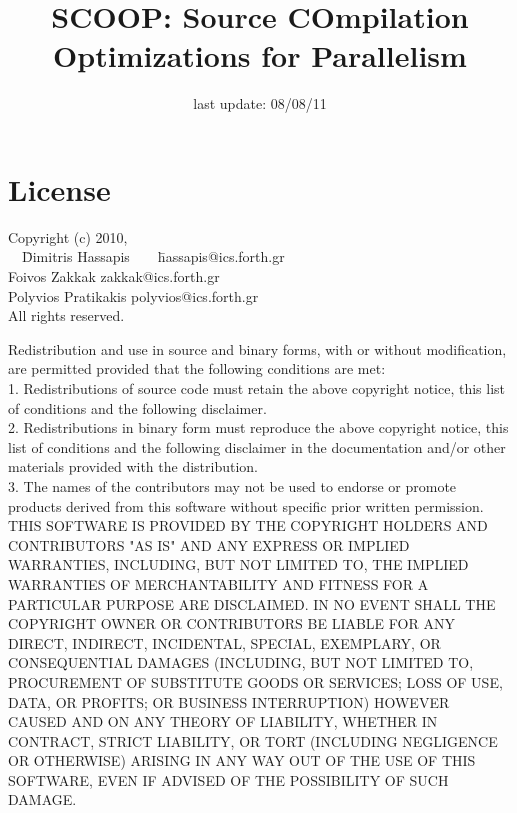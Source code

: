 \documentclass[letterpaper]{article}
\begin{document}
\title{SCOOP: Source COmpilation Optimizations for Parallelism \scoopversion}
\date{last update: 08/08/11}
\maketitle

\section{License}

\begin{tabbing}
Copyright (c) 2010,\\
\ \ \=Dimitris Hassapis\ \ \ \ \=hassapis@ics.forth.gr\\
\>Foivos Zakkak        \>zakkak@ics.forth.gr\\
\>Polyvios Pratikakis  \>polyvios@ics.forth.gr\\
All rights reserved.
\end{tabbing}

Redistribution and use in source and binary forms, with or without
modification, are permitted provided that the following conditions are
met:\\

1. Redistributions of source code must retain the above copyright
notice, this list of conditions and the following disclaimer.\\

2. Redistributions in binary form must reproduce the above copyright
notice, this list of conditions and the following disclaimer in the
documentation and/or other materials provided with the distribution.\\

3. The names of the contributors may not be used to endorse or promote
products derived from this software without specific prior written
permission.\\

THIS SOFTWARE IS PROVIDED BY THE COPYRIGHT HOLDERS AND CONTRIBUTORS "AS
IS" AND ANY EXPRESS OR IMPLIED WARRANTIES, INCLUDING, BUT NOT LIMITED
TO, THE IMPLIED WARRANTIES OF MERCHANTABILITY AND FITNESS FOR A
PARTICULAR PURPOSE ARE DISCLAIMED. IN NO EVENT SHALL THE COPYRIGHT OWNER
OR CONTRIBUTORS BE LIABLE FOR ANY DIRECT, INDIRECT, INCIDENTAL, SPECIAL,
EXEMPLARY, OR CONSEQUENTIAL DAMAGES (INCLUDING, BUT NOT LIMITED TO,
PROCUREMENT OF SUBSTITUTE GOODS OR SERVICES; LOSS OF USE, DATA, OR
PROFITS; OR BUSINESS INTERRUPTION) HOWEVER CAUSED AND ON ANY THEORY OF
LIABILITY, WHETHER IN CONTRACT, STRICT LIABILITY, OR TORT (INCLUDING
NEGLIGENCE OR OTHERWISE) ARISING IN ANY WAY OUT OF THE USE OF THIS
SOFTWARE, EVEN IF ADVISED OF THE POSSIBILITY OF SUCH DAMAGE.\\
\end{document}
